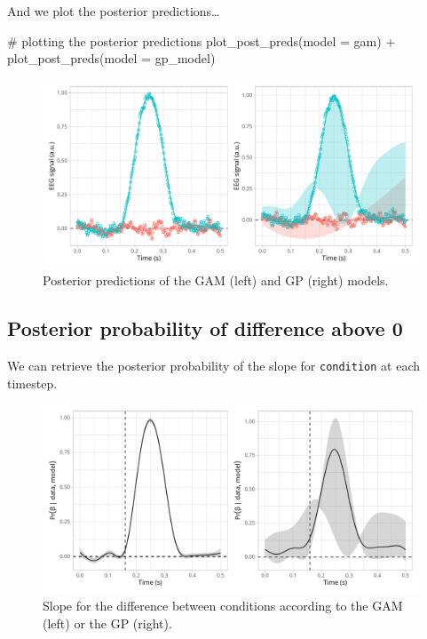 \documentclass[
  doc,
  floatsintext,
  longtable,
  a4paper,
  nolmodern,
  notxfonts,
  notimes,
  colorlinks=true,linkcolor=blue,citecolor=blue,urlcolor=blue]{apa7}
\newenvironment{Shaded}{\begin{snugshade}}{\end{snugshade}}
\newcommand{\AttributeTok}[1]{\textcolor[rgb]{0.40,0.45,0.13}{#1}}
\newcommand{\CommentTok}[1]{\textcolor[rgb]{0.37,0.37,0.37}{#1}}
\newcommand{\FunctionTok}[1]{\textcolor[rgb]{0.28,0.35,0.67}{#1}}
\newcommand{\NormalTok}[1]{\textcolor[rgb]{0.00,0.23,0.31}{#1}}
\newcommand{\SpecialCharTok}[1]{\textcolor[rgb]{0.37,0.37,0.37}{#1}}
\begin{document}
And we plot the posterior predictions\ldots{}

\begin{Shaded}
\begin{Highlighting}[]
\CommentTok{\# plotting the posterior predictions}
\FunctionTok{plot\_post\_preds}\NormalTok{(}\AttributeTok{model =}\NormalTok{ gam) }\SpecialCharTok{+} \FunctionTok{plot\_post\_preds}\NormalTok{(}\AttributeTok{model =}\NormalTok{ gp\_model)}
\end{Highlighting}
\end{Shaded}

\begin{figure}[H]

\caption{Posterior predictions of the GAM (left) and GP (right) models.}

{\centering \includegraphics[width=1\textwidth,height=\textheight]{brms_meeg_files/figure-pdf/gam-gp-preds-1.pdf}

}

\end{figure}%

\subsection{Posterior probability of difference above
0}\label{posterior-probability-of-difference-above-0}

We can retrieve the posterior probability of the slope for
\texttt{condition} at each timestep.

\begin{figure}[H]

\caption{Slope for the difference between conditions according to the
GAM (left) or the GP (right).}

{\centering \includegraphics[width=1\textwidth,height=\textheight]{brms_meeg_files/figure-pdf/unnamed-chunk-1-1.pdf}

}

\end{figure}%
\end{document}
